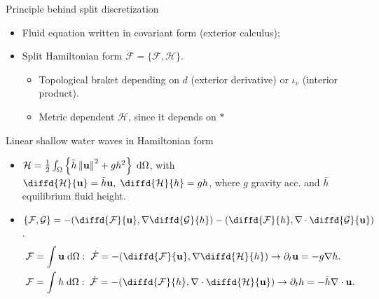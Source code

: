 \documentclass{beamer}
\newcommand*{\norm}[1]{\ensuremath{\left\|#1\right\|}}
\newcommand{\energy}[1]{\frac{1}{2} \int_{\Omega} \left\{ #1 \right\} \d\Omega}
\begin{document}
\begin{frame}[fragile]{Principle behind split discretization}
\begin{itemize}
	\item Fluid equation written in covariant form (exterior calculus);
	\item Split Hamiltonian form $\dot{\mathcal{F}}= \{\mathcal{F}, \mathcal{H}\}$.	
	\begin{itemize}
		\item Topological braket depending on $d$ (exterior derivative) or $\iota_v$ (interior product).
		\item Metric dependent $\mathcal{H}$, since it depends on $*$
	\end{itemize}
\end{itemize}	
\begin{block}{Linear shallow water waves in Hamiltonian form}
	\begin{itemize}
		\item $\mathcal{H} = \energy{\bar{h} \norm{\mathbf{u}}^2 + g h^2}$, with $\diffd{\mathcal{H}}{\mathbf{u}} = \bar{h}\mathbf{u}, \; \diffd{\mathcal{H}}{h}=g h$, where $g$ gravity acc. and $\bar{h}$ equilibrium fluid height.
		\item $\{\mathcal{F}, \mathcal{G}\} = -(\diffd{\mathcal{F}}{\mathbf{u}}, \nabla \diffd{\mathcal{G}}{h}) - (\diffd{\mathcal{F}}{h}, \nabla \cdot \diffd{\mathcal{G}}{\mathbf{u}})$.
		\begin{equation*}
			\begin{aligned}
				\mathcal{F} &= \int \mathbf{u} \d{\Omega}: \; \dot{\mathcal{F}} = - (\diffd{\mathcal{F}}{\mathbf{u}}, \nabla \diffd{\mathcal{H}}{h}) \rightarrow \partial_t \mathbf{u} = -g \nabla h. \\
				\mathcal{F} &= \int h \d{\Omega}: \;\dot{\mathcal{F}} = - (\diffd{\mathcal{F}}{h}, \nabla \cdot \diffd{\mathcal{H}}{\mathbf{u}}) \rightarrow \partial_t h = -\bar{h} \nabla \cdot \mathbf{u}.
			\end{aligned}
		\end{equation*}
		
	\end{itemize}
\end{block}

\end{frame}
\end{document}
